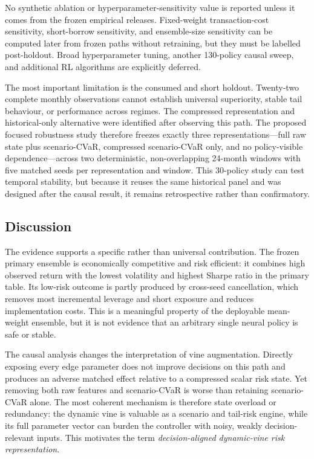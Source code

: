 No synthetic ablation or hyperparameter-sensitivity value is reported unless it comes from the frozen empirical releases. Fixed-weight transaction-cost sensitivity, short-borrow sensitivity, and ensemble-size sensitivity can be computed later from frozen paths without retraining, but they must be labelled post-holdout. Broad hyperparameter tuning, another 130-policy causal sweep, and additional RL algorithms are explicitly deferred.

The most important limitation is the consumed and short holdout. Twenty-two complete monthly observations cannot establish universal superiority, stable tail behaviour, or performance across regimes. The compressed representation and historical-only alternative were identified after observing this path. The proposed focused robustness study therefore freezes exactly three representations---full raw state plus scenario-CVaR, compressed scenario-CVaR only, and no policy-visible dependence---across two deterministic, non-overlapping 24-month windows with five matched seeds per representation and window. This 30-policy study can test temporal stability, but because it reuses the same historical panel and was designed after the causal result, it remains retrospective rather than confirmatory.

\subsection{Discussion}
\label{subsec:4_discussion}

The evidence supports a specific rather than universal contribution. The frozen primary ensemble is economically competitive and risk efficient: it combines high observed return with the lowest volatility and highest Sharpe ratio in the primary table. Its low-risk outcome is partly produced by cross-seed cancellation, which removes most incremental leverage and short exposure and reduces implementation costs. This is a meaningful property of the deployable mean-weight ensemble, but it is not evidence that an arbitrary single neural policy is safe or stable.

The causal analysis changes the interpretation of vine augmentation. Directly exposing every edge parameter does not improve decisions on this path and produces an adverse matched effect relative to a compressed scalar risk state. Yet removing both raw features and scenario-CVaR is worse than retaining scenario-CVaR alone. The most coherent mechanism is therefore state overload or redundancy: the dynamic vine is valuable as a scenario and tail-risk engine, while its full parameter vector can burden the controller with noisy, weakly decision-relevant inputs. This motivates the term \textit{decision-aligned dynamic-vine risk representation}.

